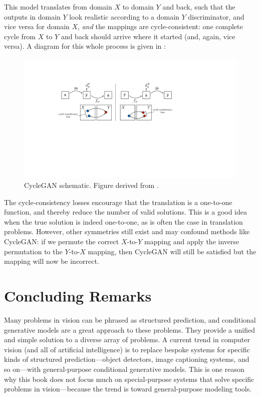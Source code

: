 This model translates from domain $X$ to domain $Y$ and back, such that the outputs in domain $Y$ look realistic according to a domain $Y$ discriminator, and vice versa for domain $X$, \textit{and} the mappings are cycle-consistent: one complete cycle from $X$ to $Y$ and back should arrive where it started (and, again, vice versa). A diagram for this whole process is given in \fig{\ref{fig:conditional_generative_models:cyclegan_schematic}}:
\begin{figure}[h!]
    \centerline{
    \includegraphics[width=1.0\linewidth]{./figures/conditional_generative_models/cyclegan_schematic.pdf}
    }
    \caption{CycleGAN schematic. Figure derived from \cite{CycleGAN2017}.}
    \label{fig:conditional_generative_models:cyclegan_schematic}
\end{figure}

The cycle-consistency losses encourage that the translation is a one-to-one function, and thereby reduce the number of valid solutions. This is a good idea when the true solution is indeed one-to-one, as is often the case in translation problems. However, other symmetries still exist and may confound methods like CycleGAN: if we permute the correct $X$-to-$Y$ mapping and apply the inverse permutation to the $Y$-to-$X$ mapping, then CycleGAN will still be satisfied but the mapping will now be incorrect.


\section{Concluding Remarks}
Many problems in vision can be phrased as structured prediction, and conditional generative models are a great approach to these problems. They provide a unified and simple solution to a diverse array of problems. A current trend in computer vision (and all of artificial intelligence) is to replace bespoke systems for specific kinds of structured prediction—object detectors, image captioning systems, and so on—with general-purpose conditional generative models. This is one reason why this book does not focus much on special-purpose systems that solve specific problems in vision—because the trend is toward general-purpose modeling tools.